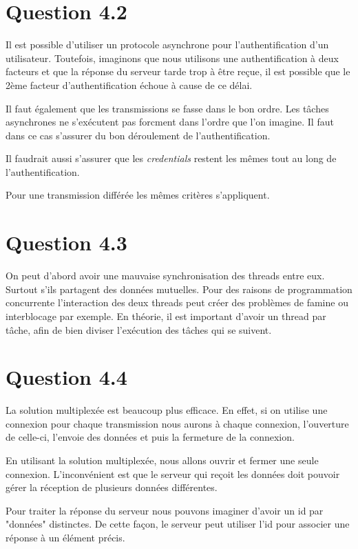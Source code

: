 \documentclass[12pt]{article}
\begin{document}
\section*{Question 4.2}

Il est possible d'utiliser un protocole asynchrone pour l'authentification d'un utilisateur.
Toutefois, imaginons que nous utilisons une authentification à deux facteurs et que la réponse du serveur tarde trop à être reçue, il est possible que le 2ème facteur d'authentification échoue à cause de ce délai.

Il faut également que les transmissions se fasse dans le bon ordre. Les tâches asynchrones ne s'exécutent pas forcment dans l'ordre que l'on imagine. Il faut dans ce cas s'assurer du bon déroulement de l'authentification.

Il faudrait aussi s'assurer que les \emph{credentials} restent les mêmes tout au long de l'authentification.

Pour une transmission différée les mêmes critères s'appliquent.


\section*{Question 4.3}
On peut d'abord avoir une mauvaise synchronisation des threads entre eux. Surtout s'ils partagent des données mutuelles. Pour des raisons de programmation concurrente l'interaction des deux threads peut créer des problèmes de famine ou interblocage par exemple.
En théorie, il est important d'avoir un thread par tâche, afin de bien diviser l'exécution des tâches qui se suivent.

\section*{Question 4.4}

La solution multiplexée est beaucoup plus efficace. En effet, si on utilise une connexion pour chaque transmission nous aurons à chaque connexion, l'ouverture de celle-ci, l'envoie des données et puis la fermeture de la connexion. 

En utilisant la solution multiplexée, nous allons ouvrir et fermer une seule connexion.
L'inconvénient est que le serveur qui reçoit les données doit pouvoir gérer la réception de plusieurs données différentes.

Pour traiter la réponse du serveur nous pouvons imaginer d'avoir un id par "données" distinctes. De cette façon, le serveur peut utiliser l'id pour associer une réponse à un élément précis.
\end{document}
